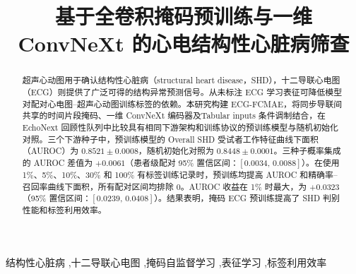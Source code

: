 \documentclass[preprint,12pt,nonatbib]{elsarticle}
\begin{document}
\begin{frontmatter}

\title{基于全卷积掩码预训练与一维 ConvNeXt 的心电结构性心脏病筛查}

\begin{abstract}
超声心动图用于确认结构性心脏病（structural heart disease，SHD），十二导联心电图（ECG）则提供了广泛可得的结构异常预测信号。从未标注 ECG 学习表征可降低模型对配对心电图--超声心动图训练标签的依赖。本研究构建 ECG-FCMAE，将同步导联间共享的时间片段掩码、一维 ConvNeXt 编码器及Tabular inputs 条件调制结合，在 EchoNext 回顾性队列中比较具有相同下游架构和训练协议的预训练模型与随机初始化对照。三个下游种子中，预训练模型的 Overall SHD 受试者工作特征曲线下面积（AUROC）为 $0.8521\pm0.0008$，随机初始化对照为 $0.8448\pm0.0001$。三种子概率集成的 AUROC 差值为 $+0.0061$（患者级配对 95\% 置信区间：$[0.0034,\,0.0088]$）。在使用 1\%、5\%、10\%、30\% 和 100\% 有标签训练记录时，预训练均提高 AUROC 和精确率--召回率曲线下面积，所有配对区间均排除 0。AUROC 收益在 1\% 时最大，为 $+0.0323$（95\% 置信区间：$[0.0239,\,0.0408]$）。结果表明，掩码 ECG 预训练提高了 SHD 判别性能和标签利用效率。
\end{abstract}

\begin{keyword}
结构性心脏病 \sep 十二导联心电图 \sep 掩码自监督学习 \sep 表征学习 \sep 标签利用效率
\end{keyword}

\end{frontmatter}



\BSPCprintbibliography
\end{document}
